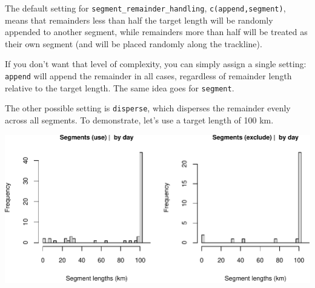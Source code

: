 \documentclass[
]{book}
\newenvironment{Shaded}{\begin{snugshade}}{\end{snugshade}}
\newcommand{\AttributeTok}[1]{\textcolor[rgb]{0.77,0.63,0.00}{#1}}
\newcommand{\CommentTok}[1]{\textcolor[rgb]{0.56,0.35,0.01}{\textit{#1}}}
\newcommand{\ConstantTok}[1]{\textcolor[rgb]{0.00,0.00,0.00}{#1}}
\newcommand{\DecValTok}[1]{\textcolor[rgb]{0.00,0.00,0.81}{#1}}
\newcommand{\FunctionTok}[1]{\textcolor[rgb]{0.00,0.00,0.00}{#1}}
\newcommand{\NormalTok}[1]{#1}
\newcommand{\OtherTok}[1]{\textcolor[rgb]{0.56,0.35,0.01}{#1}}
\newcommand{\SpecialCharTok}[1]{\textcolor[rgb]{0.00,0.00,0.00}{#1}}
\newcommand{\StringTok}[1]{\textcolor[rgb]{0.31,0.60,0.02}{#1}}
\begin{document}
The default setting for \texttt{segment\_remainder\_handling}, \texttt{c(\textquotesingle{}append\textquotesingle{},\textquotesingle{}segment\textquotesingle{})}, means that remainders less than half the target length will be randomly appended to another segment, while remainders more than half will be treated as their own segment (and will be placed randomly along the trackline).

If you don't want that level of complexity, you can simply assign a single setting: \texttt{\textquotesingle{}append\textquotesingle{}} will append the remainder in all cases, regardless of remainder length relative to the target length. The same idea goes for \texttt{\textquotesingle{}segment\textquotesingle{}}.

The other possible setting is \texttt{\textquotesingle{}disperse\textquotesingle{}}, which disperses the remainder evenly across all segments. To demonstrate, let's use a target length of 100 km.

\begin{Shaded}
\end{Shaded}

\includegraphics{figures/unnamed-chunk-403-1.pdf}
\end{document}
